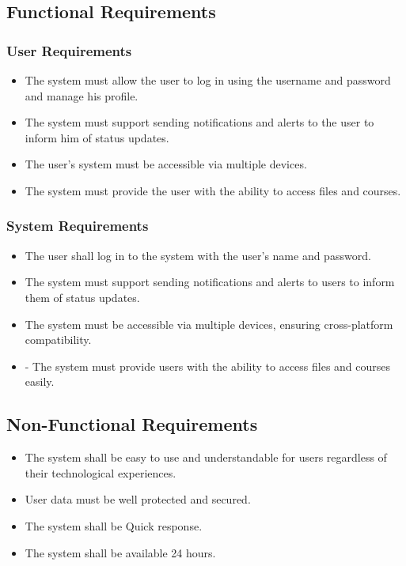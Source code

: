 \documentclass[a4paper,12pt]{article}
\begin{document}
\newpage

\subsection{Functional Requirements}

\subsubsection{User Requirements}
\begin{itemize}
    \item The system must allow the user to log in using the username and password and manage his profile.
    \item The system must support sending notifications and alerts to the user to inform him of status updates.
    \item The user's system must be accessible via multiple devices.
    \item The system must provide the user with the ability to access files and courses.
\end{itemize}


\subsubsection{System Requirements}
\begin{itemize}
    \item The user shall log in to the system with the user's name and password.
    \item The system must support sending notifications and alerts to users to inform them of status updates. 
    \item The system must be accessible via multiple devices, ensuring cross-platform compatibility.

    \item - The system must provide users with the ability to access files and courses easily.
\end{itemize}

\subsection{Non-Functional Requirements}
\begin{itemize}
    \item The system shall be easy to use and understandable for users regardless of their technological experiences.
    \item User data must be well protected and secured.
    \item The system shall be Quick response.
    \item The system shall be available 24 hours.
\end{itemize}
\end{document}
